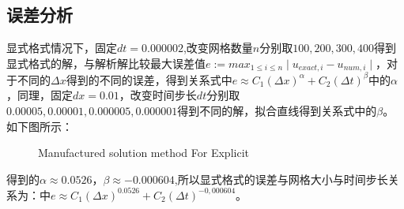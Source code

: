 \documentclass[
	20pt%
]{SUSTechHomework}
\begin{document}
\subsection{误差分析}
\qquad 显式格式情况下，固定$dt=0.000002$,改变网格数量$n$分别取$100, 200, 300, 400$得到显式格式的解，与解析解比较最大误差值$e:=max_{1 \leq i \leq n}\mid u_{exact,i} - u_{num,i}\mid$，对于不同的$\Delta x$得到的不同的误差，得到关系式中$e \approx C_1 (\Delta x)^\alpha + C_2 (\Delta t)^\beta$中的$\alpha$，同理，固定$dx=0.01$，改变时间步长$dt$分别取$0.00005, 0.00001, 0.000005, 0.000001$得到不同的解，拟合直线得到关系式中的$\beta$。如下图所示：
\begin{figure}[h]
    \centering
    \caption{Manufactured solution method For Explicit}
    \label{fig:my_label}
\end{figure}

\qquad 得到的$\alpha \approx 0.0526$，$\beta \approx -0.000604$,所以显式格式的误差与网格大小与时间步长关系为：中$e \approx C_1 (\Delta x)^0.0526 + C_2 (\Delta t)^{-0,000604}$。
\end{document}
